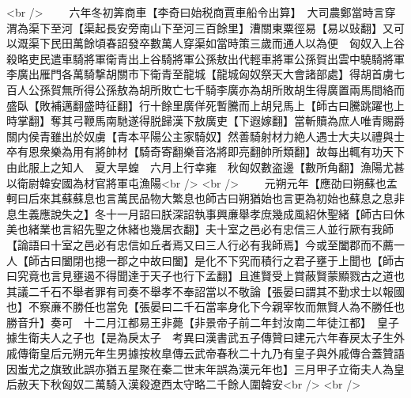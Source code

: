 <br />
　　六年冬初筭商車【李奇曰始税商賈車船令出算】　大司農鄭當時言穿渭為渠下至河【渠起長安旁南山下至河三百餘里】漕關東粟徑易【易以䜴翻】又可以溉渠下民田萬餘頃春詔發卒數萬人穿渠如當時策三歲而通人以為便　匈奴入上谷殺略吏民遣車騎將軍衛青出上谷騎將軍公孫敖出代輕車將軍公孫賀出雲中驍騎將軍李廣出雁門各萬騎撃胡關市下衛青至龍城【龍城匈奴祭天大會諸部處】得胡首虜七百人公孫賀無所得公孫敖為胡所敗亡七千騎李廣亦為胡所敗胡生得廣置兩馬間絡而盛臥【敗補邁翻盛時征翻】行十餘里廣佯死暫騰而上胡兒馬上【師古曰騰跳躍也上時掌翻】奪其弓鞭馬南馳遂得脱歸漢下敖廣吏【下遐嫁翻】當斬贖為庶人唯青賜爵關内侯青雖出於奴虜【青本平陽公主家騎奴】然善騎射材力絶人遇士大夫以禮與士卒有恩衆樂為用有將帥材【騎奇寄翻樂音洛將即亮翻帥所類翻】故每出輒有功天下由此服上之知人　夏大旱蝗　六月上行幸雍　秋匈奴數盗邊【數所角翻】漁陽尤甚以衛尉韓安國為材官將軍屯漁陽<br />
<br />
　　元朔元年【應劭曰朔蘇也孟軻曰后來其蘇蘇息也言萬民品物大繁息也師古曰朔猶始也言更為初始也蘇息之息非息生義應說失之】冬十一月詔曰朕深詔執事興亷舉孝庶幾成風紹休聖緒【師古曰休美也緒業也言紹先聖之休緒也幾居衣翻】夫十室之邑必有忠信三人並行厥有我師【論語曰十室之邑必有忠信如丘者焉又曰三人行必有我師焉】今或至闔郡而不薦一人【師古曰闔閉也摠一郡之中故曰闔】是化不下究而積行之君子壅于上聞也【師古曰究竟也言見壅遏不得聞達于天子也行下孟翻】且進賢受上賞蔽賢蒙顯戮古之道也其議二千石不舉者罪有司奏不舉孝不奉詔當以不敬論【張晏曰謂其不勤求士以報國也】不察亷不勝任也當免【張晏曰二千石當率身化下今親宰牧而無賢人為不勝任也勝音升】奏可　十二月江都易王非薨【非景帝子前二年封汝南二年徒江都】　皇子據生衛夫人之子也【是為戾太子　考異曰漢書武五子傳贊曰建元六年春戻太子生外戚傳衛皇后元朔元年生男據按枚臯傳云武帝春秋二十九乃有皇子與外戚傳合蓋贊語因蚩尤之旗致此誤亦猶五星聚在秦二世末年誤為漢元年也】三月甲子立衛夫人為皇后赦天下秋匈奴二萬騎入漢殺遼西太守略二千餘人圍韓安<br />
<br />
